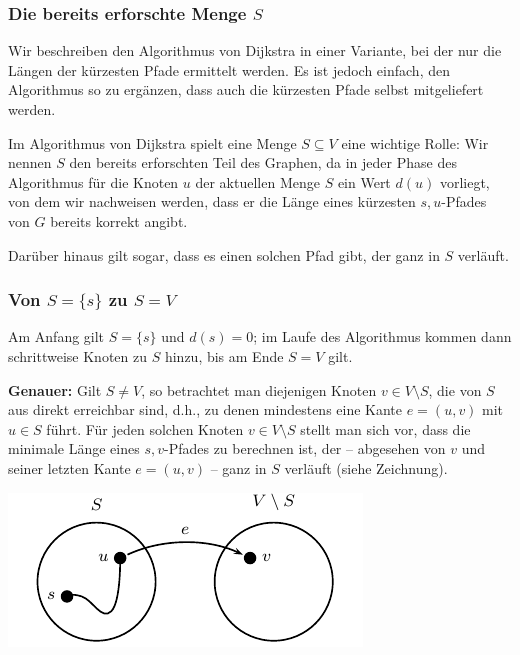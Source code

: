 \documentclass[smaller]{beamer}
\begin{document}
\begin{frame}
\frametitle{Die bereits erforschte Menge $S$}
Wir beschreiben den Algorithmus von Dijkstra in einer Variante, bei der \alert{nur die Längen der kürzesten Pfade} ermittelt werden. Es ist jedoch einfach, den Algorithmus so zu ergänzen, dass auch die kürzesten Pfade selbst mitgeliefert werden. \\ \vspace*{0.2cm}

Im Algorithmus von Dijkstra spielt eine Menge $S \subseteq V$ eine wichtige Rolle: Wir nennen $S$ den \alert{bereits erforschten Teil des Graphen}, da in jeder Phase des Algorithmus für die Knoten $u$ der aktuellen Menge $S$ ein Wert $d(u)$ vorliegt, von dem wir nachweisen werden, dass er die Länge eines kürzesten $s,u$-Pfades von $G$ bereits korrekt angibt. \\ \vspace*{0.2cm}

Darüber hinaus gilt sogar, dass es einen solchen Pfad gibt, der ganz in $S$ verläuft.
\end{frame}

\begin{frame}
\frametitle{Von $S = \{s\}$ zu $S=V$}
Am Anfang gilt $S= \bigl\{ s\bigr\}$ und $d(s) = 0$; im Laufe des Algorithmus kommen dann schrittweise Knoten zu $S$ hinzu, bis am Ende $S=V$ gilt. \\ \vspace*{0.2cm}

\textbf{Genauer:} Gilt $S \neq V$, so betrachtet man diejenigen Knoten $v \in V \setminus S$, die von $S$ aus direkt erreichbar sind, d.h., zu denen mindestens eine Kante $e=(u,v)$ mit $u \in S$ führt. Für jeden solchen Knoten $v \in V \setminus S$ stellt man sich vor, \alert{dass die minimale Länge eines $s,v$-Pfades zu berechnen ist, der -- abgesehen von $v$ und seiner letzten Kante $e=(u,v)$ -- ganz in $S$ verläuft} (siehe Zeichnung). 

\begin{center}
 \includegraphics{fig76.pdf}
\end{center}
\end{frame}
\end{document}
